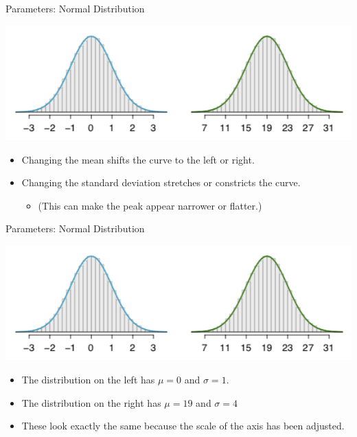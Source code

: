 \begin{frame}{Parameters: Normal Distribution}
    \begin{center}
        \includegraphics[scale=0.5]{images/meansd_normal.png}
    \end{center}
    \begin{itemize}
        \item Changing the mean shifts the curve to the left or right.
        \item Changing the standard deviation stretches or constricts the curve.
        \begin{itemize}
            \item (This can make the peak appear narrower or flatter.)
        \end{itemize}
    \end{itemize}
\end{frame}

\begin{frame}{Parameters: Normal Distribution}
    \begin{center}
        \includegraphics[scale=0.5]{images/meansd_normal.png}
    \end{center}
    \begin{itemize}
        \item The distribution on the left has $\mu=0$ and $\sigma=1$.
        \item The distribution on the right has $\mu=19$ and $\sigma=4$
        \item These look exactly the same because the scale of the axis has been adjusted. 
    \end{itemize}
\end{frame}

